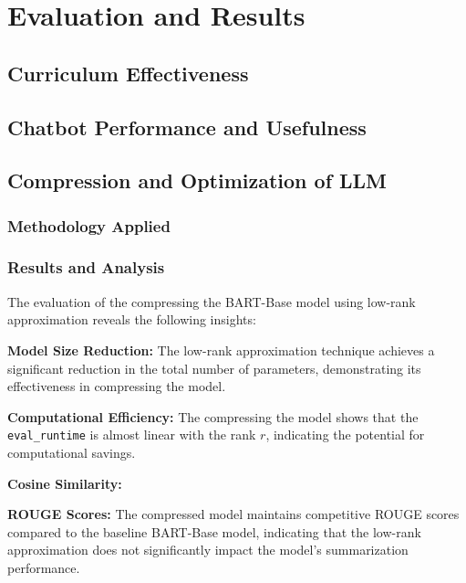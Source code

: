 \chapter{Evaluation and Results}

\section{Curriculum Effectiveness}

\section{Chatbot Performance and Usefulness}

\section{Compression and Optimization of LLM}
    \subsection{Methodology Applied}

    \subsection{Results and Analysis}
    The evaluation of the compressing the BART-Base model using low-rank approximation reveals the following insights:
    
    \textbf{Model Size Reduction:} The low-rank approximation technique achieves a significant reduction in the total number of parameters, demonstrating its effectiveness in compressing the model.
    
    \textbf{Computational Efficiency:} The compressing the model shows that the \\ \texttt{eval\_runtime} is almost linear with the rank \(r\), indicating the potential for computational savings.
    
    \textbf{Cosine Similarity:}

    \textbf{ROUGE Scores:} The compressed model maintains competitive ROUGE scores compared to the baseline BART-Base model, indicating that the low-rank approximation does not significantly impact the model's summarization performance.